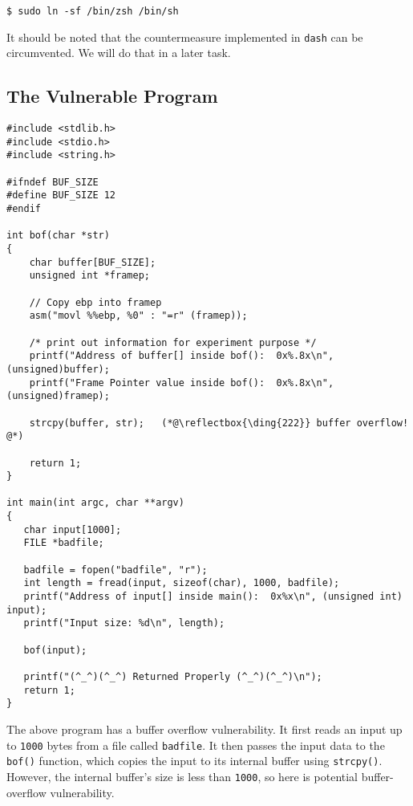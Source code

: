 \begin{lstlisting}
$ sudo ln -sf /bin/zsh /bin/sh
\end{lstlisting}


It should be noted that the countermeasure implemented in
\texttt{dash} can be circumvented. We will 
do that in a later task. 



\subsection{The Vulnerable Program}

\begin{lstlisting}[caption={The vulnerable program \texttt{retlib.c}}]
#include <stdlib.h>
#include <stdio.h>
#include <string.h>

#ifndef BUF_SIZE
#define BUF_SIZE 12
#endif

int bof(char *str)
{
    char buffer[BUF_SIZE];
    unsigned int *framep;

    // Copy ebp into framep
    asm("movl %%ebp, %0" : "=r" (framep));      

    /* print out information for experiment purpose */
    printf("Address of buffer[] inside bof():  0x%.8x\n", (unsigned)buffer);
    printf("Frame Pointer value inside bof():  0x%.8x\n", (unsigned)framep);

    strcpy(buffer, str);   (*@\reflectbox{\ding{222}} buffer overflow! @*)

    return 1;
}

int main(int argc, char **argv)
{
   char input[1000];
   FILE *badfile;

   badfile = fopen("badfile", "r");
   int length = fread(input, sizeof(char), 1000, badfile);
   printf("Address of input[] inside main():  0x%x\n", (unsigned int) input);
   printf("Input size: %d\n", length);

   bof(input);

   printf("(^_^)(^_^) Returned Properly (^_^)(^_^)\n");
   return 1;
}
\end{lstlisting}

The above program has a buffer overflow vulnerability. It first reads
an input up to \texttt{1000} bytes from a file called \texttt{badfile}. 
It then passes the input data to the \texttt{bof()} function, which
copies the input to its internal buffer using \texttt{strcpy()}. 
However, the internal buffer's size is less than \texttt{1000},
so here is potential buffer-overflow vulnerability.

